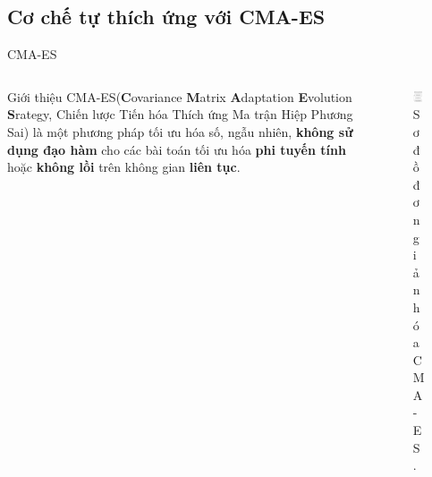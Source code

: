 \documentclass[aspectratio=169]{beamer}
\begin{document}
\subsection{Cơ chế tự thích ứng với CMA-ES}
\begin{frame}{CMA-ES}
    \begin{columns}
        \begin{column}{0.6\textwidth}
            \hspace{0.2cm}
            \begin{block}{Giới thiệu}
                \justifying
                \vspace{0.1cm}
                CMA-ES\footnotemark (\textbf{C}ovariance \textbf{M}atrix \textbf{A}daptation \textbf{E}volution \textbf{S}rategy, Chiến lược Tiến hóa Thích ứng Ma trận Hiệp Phương Sai) là một phương pháp tối ưu hóa số, ngẫu nhiên, \textbf{không sử dụng đạo hàm} cho các bài toán tối ưu hóa \textbf{phi tuyến tính} hoặc \textbf{không lồi} trên không gian \textbf{liên tục}.
                \vspace{0.1cm}
            \end{block}
        \end{column}

        \begin{column}{0.4\textwidth}
            \vspace{-0.3cm}
            \begin{figure}
                \centering
                \includegraphics[width=0.7\columnwidth]{img/simplified_CMA-ES.pdf}
                \footnotesize
                \caption{Sơ đồ đơn giản hóa CMA-ES.}
            \end{figure}
        \end{column}
    \end{columns}
    \footnotesize {}
\end{frame}
\end{document}
